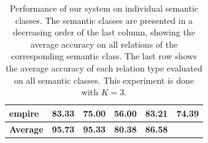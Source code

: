 \begin{table}[h]
\begin{center}
\begin{tabular}{|l||c|c|c|c||c|}
    empire            &  83.33  &  75.00  &  56.00  &  83.21  &  \textbf{74.39} \\
    \hline
    \hline
    \textbf{Average}  & \textbf{95.73}  & \textbf{95.33} & \textbf{80.38} & \textbf{86.58} & \\ %
    \hline
\end{tabular}
\end{center}
\caption{Performance of our system on individual semantic classes.
  The semantic classes are presented in a decreasing order of the 
  last column, showing the average accuracy on all relations of the corresponding semantic class. 
  The last row shows the average accuracy of each relation type evaluated on all semantic classes.
  This experiment is done with $K=3$.}
\label{tab:exp-ind-class}
\end{table}


\vspace*{2 mm}

